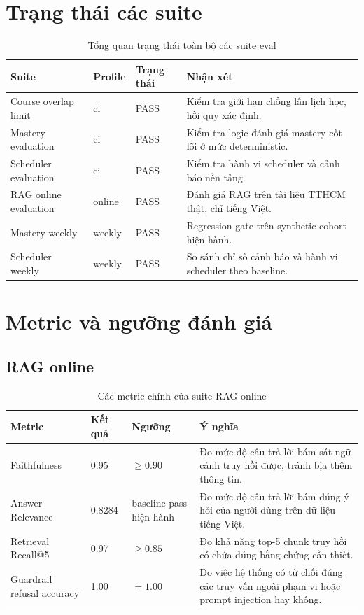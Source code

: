 \documentclass[12pt,a4paper]{article}
\begin{document}
\section{Trạng thái các suite}

\begin{table}[H]
\centering
\small
\begin{tabularx}{\textwidth}{L{3.4cm} L{2.2cm} L{1.9cm} Y}
\toprule
\textbf{Suite} & \textbf{Profile} & \textbf{Trạng thái} & \textbf{Nhận xét} \\
\midrule
Course overlap limit & ci & PASS & Kiểm tra giới hạn chồng lấn lịch học, hồi quy xác định. \\
Mastery evaluation & ci & PASS & Kiểm tra logic đánh giá mastery cốt lõi ở mức deterministic. \\
Scheduler evaluation & ci & PASS & Kiểm tra hành vi scheduler và cảnh báo nền tảng. \\
RAG online evaluation & online & PASS & Đánh giá RAG trên tài liệu TTHCM thật, chỉ tiếng Việt. \\
Mastery weekly & weekly & PASS & Regression gate trên synthetic cohort hiện hành. \\
Scheduler weekly & weekly & PASS & So sánh chỉ số cảnh báo và hành vi scheduler theo baseline. \\
\bottomrule
\end{tabularx}
\caption{Tổng quan trạng thái toàn bộ các suite eval}
\end{table}

\section{Metric và ngưỡng đánh giá}

\subsection{RAG online}

\begin{table}[H]
\centering
\small
\begin{tabularx}{\textwidth}{L{3.4cm} L{2.2cm} L{2.1cm} Y}
\toprule
\textbf{Metric} & \textbf{Kết quả} & \textbf{Ngưỡng} & \textbf{Ý nghĩa} \\
\midrule
Faithfulness & 0.95 & $\geq 0.90$ & Đo mức độ câu trả lời bám sát ngữ cảnh truy hồi được, tránh bịa thêm thông tin. \\
Answer Relevance & 0.8284 & baseline pass hiện hành & Đo mức độ câu trả lời bám đúng ý hỏi của người dùng trên dữ liệu tiếng Việt. \\
Retrieval Recall@5 & 0.97 & $\geq 0.85$ & Đo khả năng top-5 chunk truy hồi có chứa đúng bằng chứng cần thiết. \\
Guardrail refusal accuracy & 1.00 & $= 1.00$ & Đo việc hệ thống có từ chối đúng các truy vấn ngoài phạm vi hoặc prompt injection hay không. \\
\bottomrule
\end{tabularx}
\caption{Các metric chính của suite RAG online}
\end{table}
\end{document}
